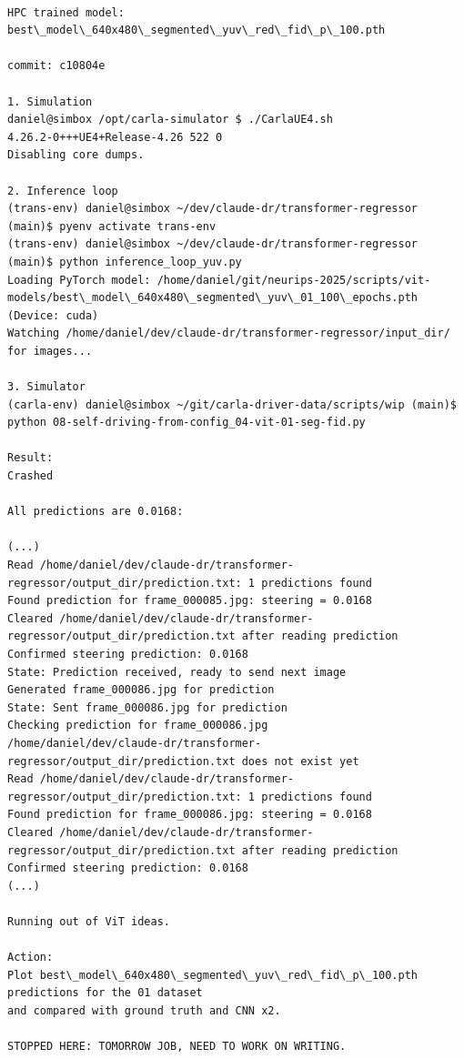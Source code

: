 \begin{verbatim}

HPC trained model: best\_model\_640x480\_segmented\_yuv\_red\_fid\_p\_100.pth

commit: c10804e

1. Simulation
daniel@simbox /opt/carla-simulator $ ./CarlaUE4.sh 
4.26.2-0+++UE4+Release-4.26 522 0
Disabling core dumps.

2. Inference loop
(trans-env) daniel@simbox ~/dev/claude-dr/transformer-regressor (main)$ pyenv activate trans-env
(trans-env) daniel@simbox ~/dev/claude-dr/transformer-regressor (main)$ python inference_loop_yuv.py 
Loading PyTorch model: /home/daniel/git/neurips-2025/scripts/vit-models/best\_model\_640x480\_segmented\_yuv\_01_100\_epochs.pth (Device: cuda)
Watching /home/daniel/dev/claude-dr/transformer-regressor/input_dir/ for images...

3. Simulator
(carla-env) daniel@simbox ~/git/carla-driver-data/scripts/wip (main)$ python 08-self-driving-from-config_04-vit-01-seg-fid.py 

Result:
Crashed

All predictions are 0.0168:

(...)
Read /home/daniel/dev/claude-dr/transformer-regressor/output_dir/prediction.txt: 1 predictions found
Found prediction for frame_000085.jpg: steering = 0.0168
Cleared /home/daniel/dev/claude-dr/transformer-regressor/output_dir/prediction.txt after reading prediction
Confirmed steering prediction: 0.0168
State: Prediction received, ready to send next image
Generated frame_000086.jpg for prediction
State: Sent frame_000086.jpg for prediction
Checking prediction for frame_000086.jpg
/home/daniel/dev/claude-dr/transformer-regressor/output_dir/prediction.txt does not exist yet
Read /home/daniel/dev/claude-dr/transformer-regressor/output_dir/prediction.txt: 1 predictions found
Found prediction for frame_000086.jpg: steering = 0.0168
Cleared /home/daniel/dev/claude-dr/transformer-regressor/output_dir/prediction.txt after reading prediction
Confirmed steering prediction: 0.0168
(...)

Running out of ViT ideas.

Action:
Plot best\_model\_640x480\_segmented\_yuv\_red\_fid\_p\_100.pth predictions for the 01 dataset 
and compared with ground truth and CNN x2.

STOPPED HERE: TOMORROW JOB, NEED TO WORK ON WRITING.
    
\end{verbatim}

